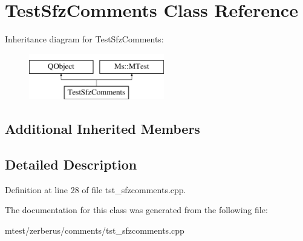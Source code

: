\hypertarget{class_test_sfz_comments}{}\section{Test\+Sfz\+Comments Class Reference}
\label{class_test_sfz_comments}
Inheritance diagram for Test\+Sfz\+Comments\+:\begin{figure}[H]
\begin{center}
\leavevmode
\includegraphics[height=2.000000cm]{class_test_sfz_comments}
\end{center}
\end{figure}
\subsection*{Additional Inherited Members}


\subsection{Detailed Description}


Definition at line 28 of file tst\+\_\+sfzcomments.\+cpp.



The documentation for this class was generated from the following file\+:\begin{DoxyCompactItemize}
\item 
mtest/zerberus/comments/tst\+\_\+sfzcomments.\+cpp\end{DoxyCompactItemize}
